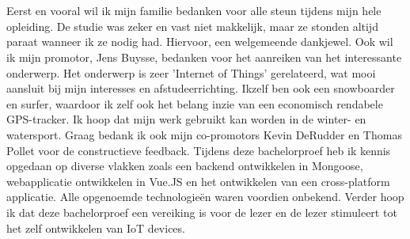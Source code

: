 
\chapter*{}
\label{ch:voorwoord}
Eerst en vooral wil ik mijn familie bedanken voor alle steun tijdens mijn hele opleiding. De studie was zeker en vast niet makkelijk, maar ze stonden altijd paraat wanneer ik ze nodig had. Hiervoor, een welgemeende dankjewel.
\newline
\newline
Ook wil ik mijn promotor, Jens Buysse, bedanken voor het aanreiken van het interessante onderwerp. Het onderwerp is zeer 'Internet of Things' gerelateerd, wat mooi aansluit bij mijn interesses en afstudeerrichting. Ikzelf ben ook een snowboarder en surfer, waardoor ik zelf ook het belang inzie van een economisch rendabele GPS-tracker. Ik hoop dat mijn werk gebruikt kan worden in de winter- en watersport.
\newline
\newline
Graag bedank ik ook mijn co-promotors Kevin DeRudder en Thomas Pollet voor de constructieve feedback.
\newline
\newline
Tijdens deze bachelorproef heb ik kennis opgedaan op diverse vlakken zoals een backend ontwikkelen in Mongoose, webapplicatie ontwikkelen in Vue.JS en het ontwikkelen van een cross-platform applicatie. Alle opgenoemde technologieën waren voordien onbekend. 
\newline
\newline
Verder hoop ik dat deze bachelorproef een vereiking is voor de lezer en de lezer stimuleert tot het zelf ontwikkelen van IoT devices.